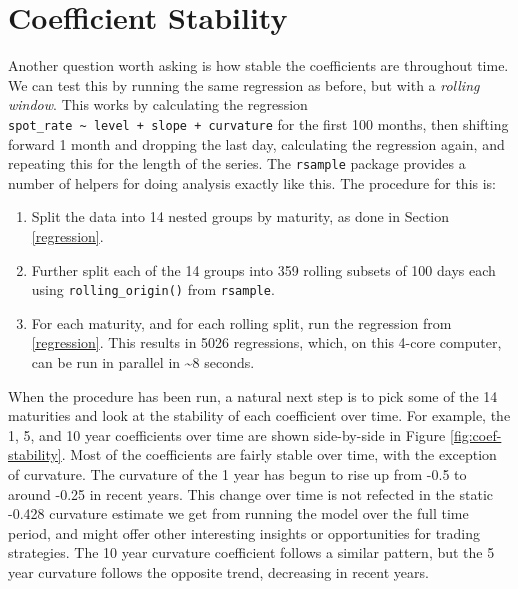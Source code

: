 \documentclass[openany]{book}
\providecommand{\tightlist}{%
  \setlength{\itemsep}{0pt}\setlength{\parskip}{0pt}}
\theoremstyle{definition}
\theoremstyle{definition}
\theoremstyle{definition}
\theoremstyle{remark}
\begin{document}
\normalsize

\hypertarget{coef-stability}{%
\section{Coefficient Stability}\label{coef-stability}}

Another question worth asking is how stable the coefficients are
throughout time. We can test this by running the same regression as
before, but with a \emph{rolling window}. This works by calculating the
regression
\texttt{spot\_rate\ \textasciitilde{}\ level\ +\ slope\ +\ curvature}
for the first 100 months, then shifting forward 1 month and dropping the
last day, calculating the regression again, and repeating this for the
length of the series. The \texttt{rsample} package provides a number of
helpers for doing analysis exactly like this. The procedure for this is:

\begin{enumerate}
\def\labelenumi{\arabic{enumi})}
\tightlist
\item
  Split the data into 14 nested groups by maturity, as done in Section
  \ref{regression}.
\item
  Further split each of the 14 groups into 359 rolling subsets of 100
  days each using \texttt{rolling\_origin()} from \texttt{rsample}.
\item
  For each maturity, and for each rolling split, run the regression from
  \ref{regression}. This results in 5026 regressions, which, on this
  4-core computer, can be run in parallel in \textasciitilde{}8 seconds.
\end{enumerate}

\small

\normalsize

\small

\normalsize

\small

\normalsize

When the procedure has been run, a natural next step is to pick some of
the 14 maturities and look at the stability of each coefficient over
time. For example, the 1, 5, and 10 year coefficients over time are
shown side-by-side in Figure \ref{fig:coef-stability}. Most of the
coefficients are fairly stable over time, with the exception of
curvature. The curvature of the 1 year has begun to rise up from -0.5 to
around -0.25 in recent years. This change over time is not refected in
the static -0.428 curvature estimate we get from running the model over
the full time period, and might offer other interesting insights or
opportunities for trading strategies. The 10 year curvature coefficient
follows a similar pattern, but the 5 year curvature follows the opposite
trend, decreasing in recent years.
\end{document}
